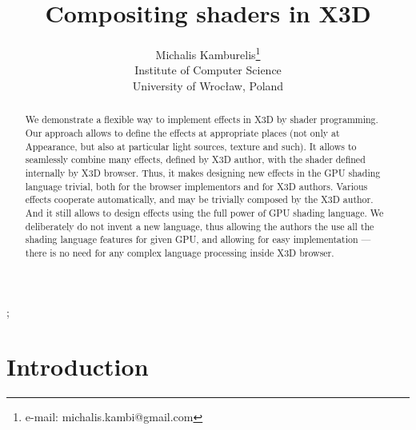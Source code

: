 \documentclass{acmsiggraph}                     %
\title{Compositing shaders in X3D}
\author{Michalis Kamburelis\thanks{e-mail: michalis.kambi@gmail.com}\\Institute of Computer Science\\University of Wroc{\l}aw, Poland}
\begin{document}

\maketitle

\begin{abstract}
We demonstrate a flexible way to implement effects in X3D \cite{x3d:spec}
by shader programming.
Our approach allows to define the effects at appropriate places
(not only at Appearance, but also at particular light sources, texture and such).
It allows to seamlessly combine many effects, defined by X3D author,
with the shader defined internally by X3D browser.
Thus, it makes designing new effects in the GPU shading language trivial,
both for the browser implementors and for X3D authors. Various effects
cooperate automatically, and may be trivially composed by the X3D author.
And it still allows to design effects using the full power of GPU shading
language. We deliberately do not invent a new language, thus allowing
the authors the use all the shading language features for given GPU,
and allowing for easy implementation --- there is no need for any complex
language processing inside X3D browser.
\end{abstract}

\begin{CRcatlist}
  ;
\end{CRcatlist}

\keywordlist


\section{Introduction}
\end{document}
